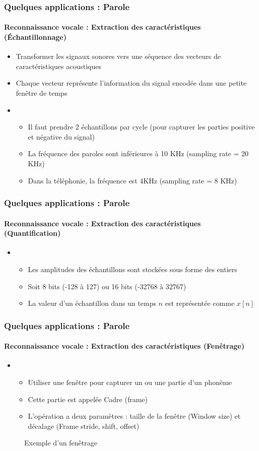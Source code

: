 \documentclass[xcolor=table]{beamer}
\begin{document}
\begin{frame}
	\frametitle{Quelques applications : Parole}
	\framesubtitle{Reconnaissance vocale : Extraction des caractéristiques (Échantillonnage)}
	\begin{itemize}
		\item Transformer les signaux sonores vers une séquence des vecteurs de caractéristiques acoustiques
		\item Chaque vecteur représente l'information du signal encodée dans une petite fenêtre de temps
		\item {}
		\begin{itemize}
			\item Il faut prendre 2 échantillons par cycle (pour capturer les parties positive et négative du signal)
			\item La fréquence des paroles sont inférieures à 10 KHz (sampling rate = 20 KHz)
			\item Dans la téléphonie, la fréquence est 4KHz (sampling rate = 8 KHz)
		\end{itemize}
	\end{itemize}
\end{frame}

\begin{frame}
	\frametitle{Quelques applications : Parole}
	\framesubtitle{Reconnaissance vocale : Extraction des caractéristiques (Quantification)}
	\begin{itemize}
		\item {}
		\begin{itemize}
			\item Les amplitudes des échantillons sont stockées sous forme des entiers
			\item Soit 8 bits (-128 à 127) ou 16 bits (-32768 à 32767)
			\item La valeur d'un échantillon dans un temps $n$ est représentée comme $x[n]$
		\end{itemize}
	\end{itemize}
\end{frame}

\begin{frame}
	\frametitle{Quelques applications : Parole}
	\framesubtitle{Reconnaissance vocale : Extraction des caractéristiques (Fenêtrage)}
	\begin{itemize}
		\item {}
		\begin{itemize}
			\item Utiliser une fenêtre pour capturer un ou une partie d'un phonème 
			\item Cette partie est appelée Cadre (frame)
			\item L'opération a deux paramètres : taille de la fenêtre (Window size) et décalage (Frame stride, shift, offset)
		\end{itemize}
	\end{itemize}
	\begin{figure}
		\centering
		\caption{Exemple d'un fenêtrage \cite{2020-jurafsky-martin}}
	\end{figure}
\end{frame}
\end{document}
